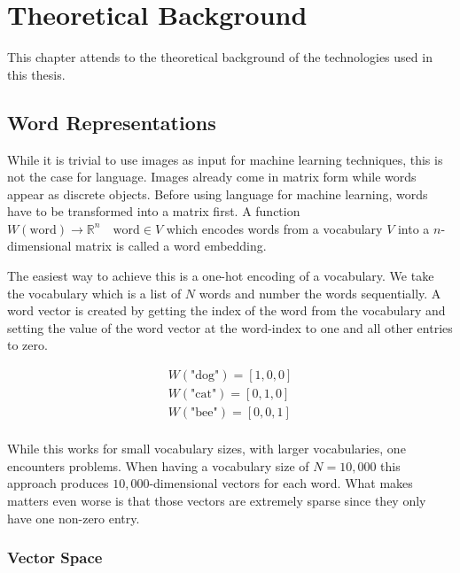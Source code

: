 \chapter{Theoretical Background}
\label{ch:theory}

This chapter attends to the theoretical background of the technologies used in this thesis.

\section{Word Representations}

While it is trivial to use images as input for machine learning techniques, this is not the case for language. Images already come in matrix form while words appear as discrete objects. Before using language for machine learning, words have to be transformed into a matrix first. A function $W(\text{word}) \rightarrow \mathbb{R}^n \quad \text{word} \in V$  which encodes words from a vocabulary $V$ into a $n$-dimensional matrix is called a word embedding.
\medskip

The easiest way to achieve this is a one-hot encoding of a vocabulary. We take the vocabulary which is a list of $N$ words and number the words sequentially. A word vector is created by getting the index of the word from the vocabulary and setting the value of the word vector at the word-index to one and all other entries to zero.

\begin{equation*}
    \begin{aligned}
        W(\text{"dog"}) = [1, 0, 0] \\
        W(\text{"cat"}) = [0, 1, 0] \\
        W(\text{"bee"}) = [0, 0, 1] \\
    \end{aligned}
\end{equation*}


While this works for small vocabulary sizes, with larger vocabularies, one encounters problems. When having a vocabulary size of $N=10,000$ this approach produces $10,000$-dimensional vectors for each word. What makes matters even worse is that those vectors are extremely sparse since they only have one non-zero entry.
\medskip

\subsection{Vector Space}
\label{sec:03_vectorSpace}

